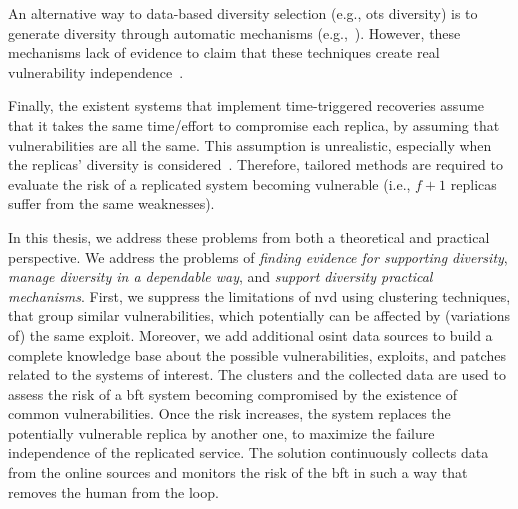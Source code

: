 An alternative way to data-based diversity selection (e.g., \gls{ots} diversity) is to generate diversity through automatic mechanisms (e.g.,~\cite{Roeder:2010,Amir:2011}).
However, these mechanisms lack of evidence to claim that these techniques create real vulnerability independence~\cite{Snow:2013,Bittau:2014}. 

Finally, the existent systems that implement time-triggered recoveries assume that it takes the same time/effort to compromise each replica, by assuming that vulnerabilities are all the same. 
This assumption is unrealistic, especially when the replicas' diversity is considered~\cite{Nayak:2014}. 
Therefore, tailored methods are required to evaluate the risk of a replicated system becoming vulnerable (i.e., $f+1$ replicas suffer from the same weaknesses).


In this thesis, we address these problems from both a theoretical and practical perspective.
We address the problems of \emph{finding evidence for supporting diversity}, \emph{manage diversity in a dependable way}, and \emph{support diversity practical mechanisms}.
First, we suppress the limitations of \gls{nvd} using clustering techniques, that group similar vulnerabilities, which potentially can be affected by (variations of) the same exploit.
Moreover, we add additional \gls{osint} data sources to build a complete knowledge base about the possible vulnerabilities, exploits, and patches related to the systems of interest. 
The clusters and the collected data are used to assess the risk of a \gls{bft} system becoming compromised by the existence of common vulnerabilities.
Once the risk increases, the system replaces the potentially vulnerable replica by another one, to maximize the failure independence of the replicated service.
The solution continuously collects data from the online sources and monitors the risk of the \gls{bft} in such a way that removes the human from the loop.

